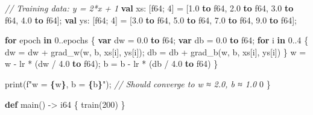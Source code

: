 \documentclass[
  english,
]{book}
\newenvironment{Shaded}{\begin{snugshade}}{\end{snugshade}}
\newcommand{\CommentTok}[1]{\textcolor[rgb]{0.42,0.60,0.33}{\textit{#1}}}
\newcommand{\ControlFlowTok}[1]{\textcolor[rgb]{0.77,0.53,0.75}{\textbf{#1}}}
\newcommand{\DataTypeTok}[1]{\textcolor[rgb]{0.31,0.79,0.69}{#1}}
\newcommand{\DecValTok}[1]{\textcolor[rgb]{0.71,0.81,0.66}{#1}}
\newcommand{\FloatTok}[1]{\textcolor[rgb]{0.71,0.81,0.66}{#1}}
\newcommand{\FunctionTok}[1]{\textcolor[rgb]{0.86,0.86,0.67}{#1}}
\newcommand{\KeywordTok}[1]{\textcolor[rgb]{0.34,0.61,0.84}{\textbf{#1}}}
\newcommand{\NormalTok}[1]{\textcolor[rgb]{0.83,0.83,0.83}{#1}}
\newcommand{\OperatorTok}[1]{\textcolor[rgb]{0.83,0.83,0.83}{#1}}
\newcommand{\StringTok}[1]{\textcolor[rgb]{0.81,0.57,0.47}{#1}}
\begin{document}
\begin{Shaded}
\begin{Highlighting}[]
    \CommentTok{// Training data: y = 2*x + 1}
    \KeywordTok{val}\NormalTok{ xs: [}\DataTypeTok{f64}\NormalTok{; }\DecValTok{4}\NormalTok{] }\OperatorTok{=}\NormalTok{ [}\FloatTok{1.0} \KeywordTok{to} \DataTypeTok{f64}\NormalTok{, }\FloatTok{2.0} \KeywordTok{to} \DataTypeTok{f64}\NormalTok{, }\FloatTok{3.0} \KeywordTok{to} \DataTypeTok{f64}\NormalTok{, }\FloatTok{4.0} \KeywordTok{to} \DataTypeTok{f64}\NormalTok{];}
    \KeywordTok{val}\NormalTok{ ys: [}\DataTypeTok{f64}\NormalTok{; }\DecValTok{4}\NormalTok{] }\OperatorTok{=}\NormalTok{ [}\FloatTok{3.0} \KeywordTok{to} \DataTypeTok{f64}\NormalTok{, }\FloatTok{5.0} \KeywordTok{to} \DataTypeTok{f64}\NormalTok{, }\FloatTok{7.0} \KeywordTok{to} \DataTypeTok{f64}\NormalTok{, }\FloatTok{9.0} \KeywordTok{to} \DataTypeTok{f64}\NormalTok{];}

    \ControlFlowTok{for}\NormalTok{ epoch }\ControlFlowTok{in} \DecValTok{0}\OperatorTok{..}\NormalTok{epochs \{}
        \KeywordTok{var}\NormalTok{ dw }\OperatorTok{=} \FloatTok{0.0} \KeywordTok{to} \DataTypeTok{f64}\NormalTok{;}
        \KeywordTok{var}\NormalTok{ db }\OperatorTok{=} \FloatTok{0.0} \KeywordTok{to} \DataTypeTok{f64}\NormalTok{;}
        \ControlFlowTok{for}\NormalTok{ i }\ControlFlowTok{in} \DecValTok{0}\OperatorTok{..}\DecValTok{4}\NormalTok{ \{}
\NormalTok{            dw }\OperatorTok{=}\NormalTok{ dw }\OperatorTok{+}\NormalTok{ grad\_w(w, b, xs[i], ys[i]);}
\NormalTok{            db }\OperatorTok{=}\NormalTok{ db }\OperatorTok{+}\NormalTok{ grad\_b(w, b, xs[i], ys[i])}
\NormalTok{        \}}
\NormalTok{        w }\OperatorTok{=}\NormalTok{ w }\OperatorTok{{-}}\NormalTok{ lr }\OperatorTok{*}\NormalTok{ (dw }\OperatorTok{/} \FloatTok{4.0} \KeywordTok{to} \DataTypeTok{f64}\NormalTok{);}
\NormalTok{        b }\OperatorTok{=}\NormalTok{ b }\OperatorTok{{-}}\NormalTok{ lr }\OperatorTok{*}\NormalTok{ (db }\OperatorTok{/} \FloatTok{4.0} \KeywordTok{to} \DataTypeTok{f64}\NormalTok{)}
\NormalTok{    \}}

    \FunctionTok{print}\NormalTok{(}\StringTok{f"w = }\ControlFlowTok{\{}\NormalTok{w}\ControlFlowTok{\}}\StringTok{, b = }\ControlFlowTok{\{}\NormalTok{b}\ControlFlowTok{\}}\StringTok{"}\NormalTok{);}
    \CommentTok{// Should converge to w ≈ 2.0, b ≈ 1.0}
    \DecValTok{0}
\NormalTok{\}}

\KeywordTok{def}\NormalTok{ main() }\OperatorTok{{-}\textgreater{}} \DataTypeTok{i64}\NormalTok{ \{}
\NormalTok{    train(}\DecValTok{200}\NormalTok{)}
\NormalTok{\}}
\end{Highlighting}
\end{Shaded}
\end{document}
